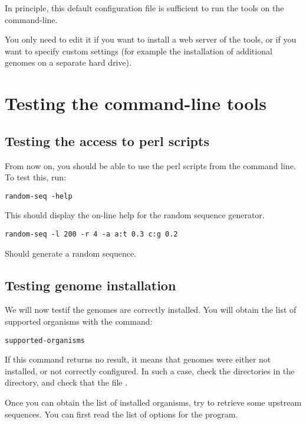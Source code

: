 \documentclass{article}
\begin{document}
In principle, this default configuration file is sufficient to run the
tools on the command-line. 

You only need to edit it if you want to install a web server of the
tools, or if you want to specify custom settings (for example the
installation of additional genomes on a separate hard drive).


\section{Testing the command-line tools}

\subsection{Testing the access to perl scripts}

From now on, you should be able to use the perl scripts from the
command line. To test this, run: 

\begin{verbatim}
random-seq -help
\end{verbatim}

This should display the on-line help for the random sequence
generator. 

\begin{verbatim}
random-seq -l 200 -r 4 -a a:t 0.3 c:g 0.2
\end{verbatim}

Should generate a random sequence.

\subsection{Testing genome installation}

We will now testif the genomes are correctly installed. You will
obtain the list of supported organisms with the command:

\begin{verbatim}
supported-organisms
\end{verbatim}

If this command returns no result, it means that genomes were either
not installed, or not correctly configured. In such a case, check the
directories in the  directory, and check that the
file .

Once you can obtain the list of installed organisms, try to retrieve
some upstream sequences. You can first read the list of options for the
 program.
\end{document}
